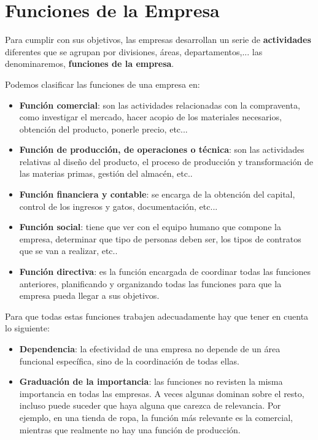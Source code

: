 \section{Funciones de la Empresa}
Para cumplir con sus objetivos, las empresas desarrollan un serie de \textbf{actividades} diferentes que se agrupan por divisiones, áreas, departamentos,... las denominaremos, \textbf{funciones de la empresa}.

Podemos clasificar las funciones de una empresa en:

\begin{itemize}
    \item \textbf{Función comercial}: son las actividades relacionadas con la compraventa, como investigar el mercado, hacer acopio de los materiales necesarios, obtención del producto, ponerle precio, etc...
    \item \textbf{Función de producción, de operaciones o técnica}: son las actividades relativas al diseño del producto, el proceso de producción y transformación de las materias primas, gestión del almacén, etc..
    \item \textbf{Función financiera y contable}: se encarga de la obtención del capital, control de los ingresos y gatos, documentación, etc...
    \item \textbf{Función social}: tiene que ver con el equipo humano que compone la empresa, determinar que tipo de personas deben ser, los tipos de contratos que se van a realizar, etc..
    \item \textbf{Función directiva}: es la función encargada de coordinar todas las funciones anteriores, planificando y organizando todas las funciones para que la empresa pueda llegar a sus objetivos.
\end{itemize}

Para que todas estas funciones trabajen adecuadamente hay que tener en cuenta lo siguiente:

\begin{itemize}
    \item \textbf{Dependencia}: la efectividad de una empresa no depende de un área funcional específica, sino de la coordinación de todas ellas.

    \item \textbf{Graduación de la importancia}: las funciones no revisten la misma importancia en todas las empresas. A veces algunas dominan sobre el resto, incluso puede suceder que haya alguna que carezca de relevancia. Por ejemplo, en una tienda de ropa, la función más relevante es la comercial, mientras que realmente no hay una función de producción.
\end{itemize}

